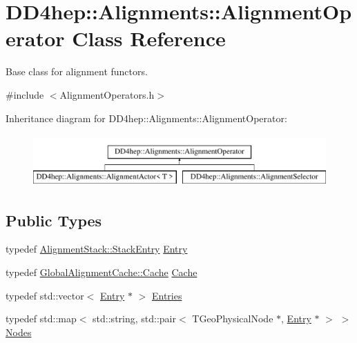 \hypertarget{class_d_d4hep_1_1_alignments_1_1_alignment_operator}{}\section{D\+D4hep\+:\+:Alignments\+:\+:Alignment\+Operator Class Reference}
\label{class_d_d4hep_1_1_alignments_1_1_alignment_operator}


Base class for alignment functors.  




{\ttfamily \#include $<$Alignment\+Operators.\+h$>$}

Inheritance diagram for D\+D4hep\+:\+:Alignments\+:\+:Alignment\+Operator\+:\begin{figure}[H]
\begin{center}
\leavevmode
\includegraphics[height=2.000000cm]{class_d_d4hep_1_1_alignments_1_1_alignment_operator}
\end{center}
\end{figure}
\subsection*{Public Types}
\begin{DoxyCompactItemize}
\item 
typedef \hyperlink{struct_d_d4hep_1_1_alignments_1_1_alignment_stack_1_1_stack_entry}{Alignment\+Stack\+::\+Stack\+Entry} \hyperlink{class_d_d4hep_1_1_alignments_1_1_alignment_operator_a0dc91b46151c3685f152574147339899}{Entry}
\item 
typedef \hyperlink{class_d_d4hep_1_1_alignments_1_1_global_alignment_cache_a51cc6e8b7d9d85cfc296e8db7f360604}{Global\+Alignment\+Cache\+::\+Cache} \hyperlink{class_d_d4hep_1_1_alignments_1_1_alignment_operator_aa2e6502de3afb25286845cae785ab1d7}{Cache}
\item 
typedef std\+::vector$<$ \hyperlink{class_d_d4hep_1_1_alignments_1_1_alignment_operator_a0dc91b46151c3685f152574147339899}{Entry} $\ast$ $>$ \hyperlink{class_d_d4hep_1_1_alignments_1_1_alignment_operator_ada83b10531c5774c75f6e8c224f55f4c}{Entries}
\item 
typedef std\+::map$<$ std\+::string, std\+::pair$<$ T\+Geo\+Physical\+Node $\ast$, \hyperlink{class_d_d4hep_1_1_alignments_1_1_alignment_operator_a0dc91b46151c3685f152574147339899}{Entry} $\ast$ $>$ $>$ \hyperlink{class_d_d4hep_1_1_alignments_1_1_alignment_operator_a2f25eae1d38abc30a09f7a840ab0662a}{Nodes}
\end{DoxyCompactItemize}
